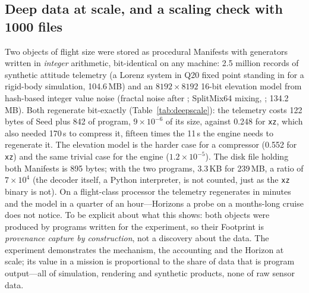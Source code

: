 \documentclass[11pt,a4paper]{article}
\theoremstyle{definition}
\theoremstyle{plain}
\theoremstyle{remark}
\begin{document}
\begin{table}[!htb]
\centering\small
\caption{Compiled fixed-point engine (hidden 128), blocks mode, by OpenMP thread count on a
machine with one physical core and two hardware threads.}
\label{tab:fast}
{\footnotesize\setlength{\tabcolsep}{4pt}\fastTable{}}
\end{table}

\subsection{Deep data at scale, and a scaling check with 1000 files}
\label{sec:deepscale}
\label{sec:proof1000}
Two objects of flight size were stored as procedural Manifests with generators written in
\emph{integer} arithmetic, bit-identical on any machine: 2.5 million records of synthetic attitude
telemetry (a Lorenz system in Q20 fixed point standing in for a rigid-body simulation, 104.6\,MB) and an $8192\times8192$ 16-bit
elevation model from hash-based integer value noise (fractal noise after \citealp{perlin1985};
SplitMix64 mixing, \citealp{steele2014splitmix}; 134.2\,MB). Both regenerate bit-exactly
(Table~\ref{tab:deepscale}): the telemetry costs 122 bytes of Seed plus 842 of program,
$9\times10^{-6}$ of its size, against 0.248 for \texttt{xz}, which also needed 170\,s to compress
it, fifteen times the 11\,s the engine needs to regenerate it. The elevation model is the harder case for a
compressor (0.552 for \texttt{xz}) and the same trivial case for the engine ($1.2\times10^{-5}$).
The disk file holding both Manifests is 895 bytes; with the two programs, 3.3\,KB for 239\,MB, a
ratio of $7\times10^{4}$ (the decoder itself, a Python interpreter, is not counted, just as the
\texttt{xz} binary is not). On a flight-class processor the telemetry regenerates in minutes and
the model in a quarter of an hour---Horizons a probe on a months-long cruise does not notice. To be explicit about what this shows:
both objects were produced by programs written for the experiment, so their Footprint is
\emph{provenance capture by construction}, not a discovery about the data. The experiment
demonstrates the mechanism, the accounting and the Horizon at scale; its value in a mission is
proportional to the share of data that is program output---all of simulation, rendering and
synthetic products, none of raw sensor data.

\begin{table}[!htb]
\centering\small
\caption{Deep data at scale (Footprint counts Seed and program; \texttt{gzip -6}/\texttt{xz -6}
because of the sizes; the flight-class column scales the measured time by ten and is indicative
only---a RAD750/LEON-class processor may be thirty times slower).}
\label{tab:deepscale}
{\footnotesize\setlength{\tabcolsep}{2.4pt}\deepTable{}}
\end{table}
\end{document}
